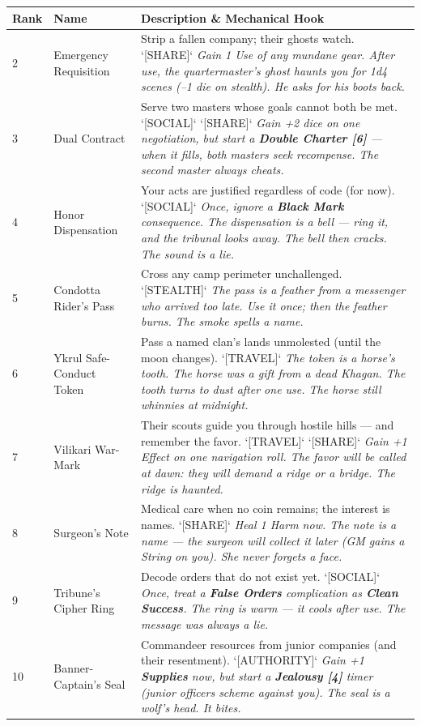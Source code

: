 \begin{longtable}{|p{}|p{}|p{}|}
\hline
\textbf{Rank} & \textbf{Name} & \textbf{Description \& Mechanical Hook} \\
\hline
2 & Emergency Requisition & Strip a fallen company; their ghosts watch. `[SHARE]` \textit{Gain 1 Use of any mundane gear. After use, the quartermaster's ghost haunts you for 1d4 scenes (--1 die on stealth). He asks for his boots back.} \\
\hline
3 & Dual Contract & Serve two masters whose goals cannot both be met. `[SOCIAL]` `[SHARE]` \textit{Gain +2 dice on one negotiation, but start a \textbf{Double Charter [6]} --- when it fills, both masters seek recompense. The second master always cheats.} \\
\hline
4 & Honor Dispensation & Your acts are justified regardless of code (for now). `[SOCIAL]` \textit{Once, ignore a \textbf{Black Mark} consequence. The dispensation is a bell --- ring it, and the tribunal looks away. The bell then cracks. The sound is a lie.} \\
\hline
5 & Condotta Rider's Pass & Cross any camp perimeter unchallenged. `[STEALTH]` \textit{The pass is a feather from a messenger who arrived too late. Use it once; then the feather burns. The smoke spells a name.} \\
\hline
6 & Ykrul Safe-Conduct Token & Pass a named clan's lands unmolested (until the moon changes). `[TRAVEL]` \textit{The token is a horse's tooth. The horse was a gift from a dead Khagan. The tooth turns to dust after one use. The horse still whinnies at midnight.} \\
\hline
7 & Vilikari War-Mark & Their scouts guide you through hostile hills --- and remember the favor. `[TRAVEL]` `[SHARE]` \textit{Gain +1 Effect on one navigation roll. The favor will be called at dawn: they will demand a ridge or a bridge. The ridge is haunted.} \\
\hline
8 & Surgeon's Note & Medical care when no coin remains; the interest is names. `[SHARE]` \textit{Heal 1 Harm now. The note is a name --- the surgeon will collect it later (GM gains a String on you). She never forgets a face.} \\
\hline
9 & Tribune's Cipher Ring & Decode orders that do not exist yet. `[SOCIAL]` \textit{Once, treat a \textbf{False Orders} complication as \textbf{Clean Success}. The ring is warm --- it cools after use. The message was always a lie.} \\
\hline
10 & Banner-Captain's Seal & Commandeer resources from junior companies (and their resentment). `[AUTHORITY]` \textit{Gain +1 \textbf{Supplies} now, but start a \textbf{Jealousy [4]} timer (junior officers scheme against you). The seal is a wolf's head. It bites.} \\

\end{longtable}
